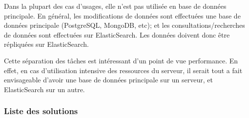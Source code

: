         Dans la plupart des cas d'usages, elle n'est pas utilisée en base de données principale. En général,
        les modifications de données sont effectuées une base de données principale (PostgreSQL, MongoDB, etc);
        et les consultations/recherches de données sont effectuées sur ElasticSearch. Les données doivent donc être répliquées sur ElasticSearch.

        Cette séparation des tâches est intéressant d'un point de vue performance. En effet, en cas d'utilisation intensive
        des ressources du serveur, il serait tout a fait envisageable d'avoir une base de données principale sur un serveur,
        et ElasticSearch sur un autre.


        \subsubsection{Liste des solutions}
        \label{subsubsec:bddsolutions}

